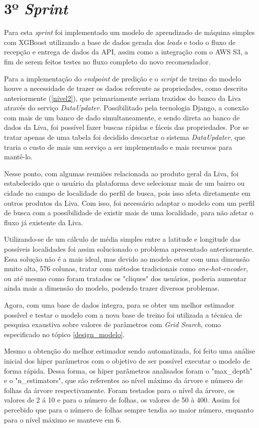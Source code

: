 \section{3º \textit{Sprint}}

Para esta \textit{sprint} foi implementado um modelo de aprendizado de máquina simples com XGBoost utilizando a base de dados gerada dos \textit{leads} e todo o fluxo de recepção e entrega de dados da API, assim como a integração com o AWS S3, a fim de serem feitos testes no fluxo completo do novo recomendador.

Para a implementação do \textit{endpoint} de predição e o \textit{script} de treino do modelo houve a necessidade de trazer os dados referente as propriedades, como descrito anteriormente (\ref{nivel2}), que primariamente seriam trazidos do banco da Liva através do serviço \textit{DataUpdater}. Possibilitado pela tecnologia Django, a conexão com mais de um banco de dado simultaneamente, e sendo direta ao banco de dados da Liva, foi possível fazer buscas rápidas e fáceis das propriedades. Por se tratar apenas de uma tabela foi decidido descartar o sistema \textit{DataUpdater}, que traria o custo de mais um serviço a ser implementado e mais recursos para mantê-lo.

Nesse ponto, com algumas reuniões relacionada ao produto geral da Liva, foi estabelecido que o usuário da plataforma deve selecionar mais de um bairro ou cidade no campo de localidade do perfil de busca, pois isso afeta diretamente em outros produtos da Liva. Com isso, foi necessário adaptar o modelo com um perfil de busca com a possibilidade de existir mais de uma localidade, para não afetar o fluxo já existente da Liva.

Utilizando-se de um cálculo de média simples entre a latitude e longitude das possíveis localidades foi assim solucionado o problema apresentado anteriormente. Essa solução não é a mais ideal, mas devido ao modelo estar com uma dimensão muito alta, 576 colunas, tratar com métodos tradicionais como \textit{one-hot-encoder}, ou até mesmo como foram tratados os "cliques" dos usuários, poderia aumentar ainda mais a dimensão do modelo, podendo trazer diversos problemas.

Agora, com uma base de dados integra, para se obter um melhor estimador possível e testar o modelo com a nova base de treino foi utilizada a técnica de pesquisa exaustiva sobre valores de parâmetros com \textit{Grid Search}, como especificado no tópico \ref{design_modelo}.

Mesmo a obtenção do melhor estimador sendo automatizada, foi feito uma análise inicial dos hiper parâmetros com o objetivo de ser possível executar o modelo de forma rápida. Dessa forma, os hiper parâmetros analisados foram o "max\_depth" e o "n\_estimators", que são referentes ao nível máximo da árvore e número de folhas da árvore respectivamente. Foram testados para o nível da árvore, os valores de 2 á 10 e para o número de folhas, os valores de 50 à 400. Assim foi percebido que para o número de folhas sempre tendia ao maior número, enquanto para o nível máximo se manteve em 6.

